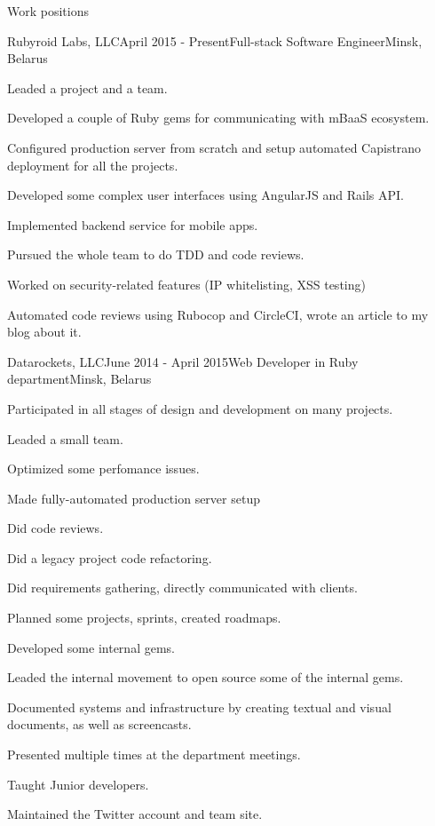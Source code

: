 \documentclass{resume} %
\begin{document}

\begin{rSection}{Work positions}

\begin{rSubsection}{Rubyroid Labs, LLC}{April 2015 - Present}{Full-stack Software Engineer}{Minsk, Belarus}
\item	Leaded a project and a team.
\item	Developed a couple of Ruby gems for communicating with mBaaS ecosystem.
\item Configured production server from scratch and setup automated Capistrano deployment for all the projects.
\item Developed some complex user interfaces using AngularJS and Rails API.
\item Implemented backend service for mobile apps.
\item Pursued the whole team to do TDD and code reviews. 
\item Worked on security-related features (IP whitelisting, XSS testing)
\item Automated code reviews using Rubocop and CircleCI, wrote an article to my blog about it.
\end{rSubsection}

\begin{rSubsection}{Datarockets, LLC}{June 2014 - April 2015}{Web Developer in Ruby department}{Minsk, Belarus}
\item Participated in all stages of design and development on many projects.
\item	Leaded a small team.
\item	Optimized some perfomance issues.
\item Made fully-automated production server setup
\item Did code reviews.
\item Did a legacy project code refactoring.
\item	Did requirements gathering, directly communicated with clients.
\item	Planned some projects, sprints, created roadmaps.
\item	Developed some internal gems.
\item	Leaded the internal movement to open source some of the internal gems.
\item	Documented systems and infrastructure by creating textual and visual documents, as well as screencasts.
\item Presented multiple times at the department meetings.
\item	Taught Junior developers.
\item	Maintained the Twitter account and team site.
\end{rSubsection}

\end{rSection}
\end{document}
